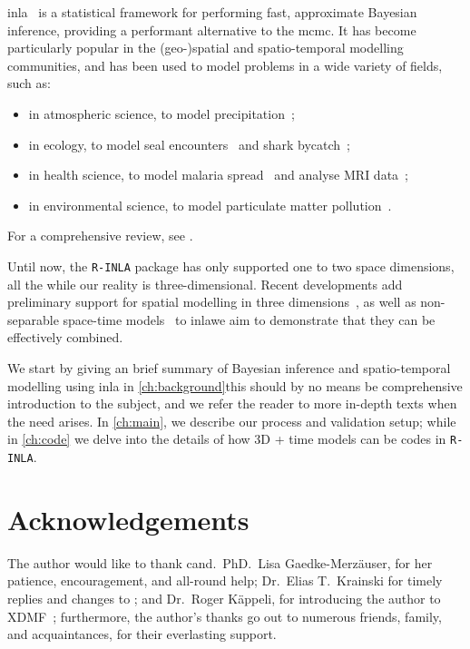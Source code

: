 \documentclass[british]{scrreprt}
\begin{document}
\Acrfull{inla}~\cite{RueApproximateBayesianinference2009} is a statistical framework for performing fast, approximate Bayesian inference, providing a performant alternative to the \gls{mcmc}. It has become particularly popular in the (geo-)spatial and spatio-temporal modelling communities, and has been used to model problems in a wide variety of fields, such as:
\begin{itemize}
    \item in atmospheric science, to model precipitation~\cite{IngebrigtsenEstimationnonstationarymodel2015};
    \item in ecology, to model seal encounters~\cite{CarsonSealencounterssea2014} and shark bycatch~\cite{Cosandey-GodinApplyingBayesianspatiotemporal2015};
    \item in health science, to model malaria spread~\cite{MoragaBayesianspatialmodelling2021} and analyse MRI data~\cite{SidenSpatial3DMatern2020};
    \item in environmental science, to model particulate matter pollution~\cite{CamelettiSpatiotemporalmodelingparticulate2013}.
\end{itemize}
For a comprehensive review, see \cite{LindgrenSPDEapproachGaussian2022}.

Until now, the \texttt{R-INLA} package has only supported one to two space dimensions, all the while our reality is three-dimensional. Recent developments add preliminary support for spatial modelling in three dimensions~\cite{Lindgreninlamesh3d2022}, as well as non-separable space-time models~\cite{Lindgrendiffusionbasedspatiotemporalextension2022} to \gls{inla}\textemdash{}we aim to demonstrate that they can be effectively combined.

We start by giving an brief summary of Bayesian inference and spatio-temporal modelling using \gls{inla} in \cref{ch:background}\textemdash{}this should by no means be comprehensive introduction to the subject, and we refer the reader to more in-depth texts when the need arises. In \cref{ch:main}, we describe our process and validation setup; while in \cref{ch:code} we delve into the details of how 3D + time models can be codes in \texttt{R-INLA}.

\section{Acknowledgements}
\label{sec:acknowledgements}
The author would like to thank cand.~PhD.~Lisa Gaedke-Merzäuser, for her patience, encouragement, and all-round help; Dr.~Elias T.~Krainski for timely replies and changes to \cite{KrainskiINLAspacetime2022}; and Dr.~Roger Käppeli, for introducing the author to XDMF~\cite{XDMF}; furthermore, the author's thanks go out to numerous friends, family, and acquaintances, for their everlasting support.
\end{document}
